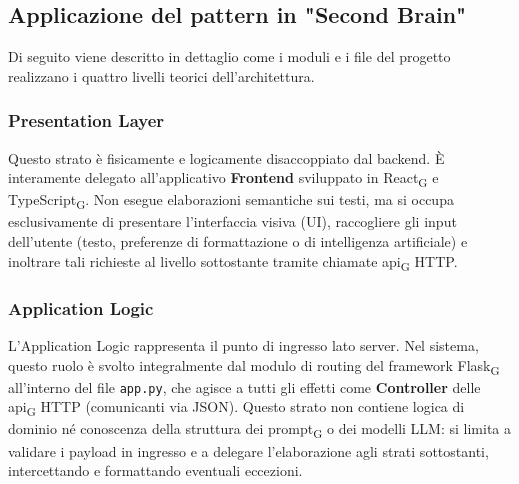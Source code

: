 \documentclass[11pt,a4paper]{article}
\newcommand{\gls}[1]{#1\textsubscript{G}}
\begin{document}
\subsection{Applicazione del pattern in "Second Brain"}
Di seguito viene descritto in dettaglio come i moduli e i file del progetto realizzano i quattro livelli teorici dell'architettura.


\subsubsection{Presentation Layer}
Questo strato è fisicamente e logicamente disaccoppiato dal backend. È interamente delegato all'applicativo \textbf{Frontend} sviluppato in \gls{React} e \gls{TypeScript}. Non esegue elaborazioni semantiche sui testi, ma si occupa esclusivamente di presentare l'interfaccia visiva (UI), raccogliere gli input dell'utente (testo, preferenze di formattazione o di intelligenza artificiale) e inoltrare tali richieste al livello sottostante tramite chiamate \gls{api} HTTP.

\subsubsection{Application Logic}
L'Application Logic rappresenta il punto di ingresso lato server. Nel sistema, questo ruolo è svolto integralmente dal modulo di routing del framework \gls{Flask} all'interno del file \texttt{app.py}, che agisce a tutti gli effetti come \textbf{Controller} delle \gls{api} HTTP (comunicanti via JSON). Questo strato non contiene logica di dominio né conoscenza della struttura dei \gls{prompt} o dei modelli LLM: si limita a validare i payload in ingresso e a delegare l'elaborazione agli strati sottostanti, intercettando e formattando eventuali eccezioni.
\end{document}
